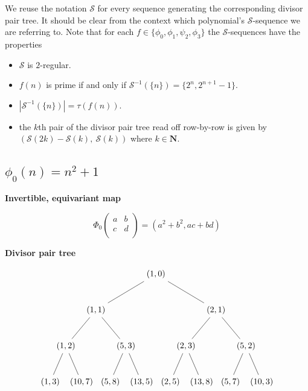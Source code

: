 \documentclass{article}
\begin{document}
 
 We reuse the notation $\mathcal{S}$ for every sequence generating the corresponding divisor pair tree. It should be clear from the context which polynomial's $\mathcal{S}$-sequence we are referring to. Note that for each $f \in \{\phi_0, \phi_1, \psi_2, \phi_3 \}$ the $\mathcal{S}$-sequences have the properties

\begin{itemize}
    \item $\mathcal{S}$ is $2$-regular.
    \item $f(n)$ is prime if and only if $\mathcal{S}^{-1}(\{n\}) = \{2^n, 2^{n+1} - 1 \}$.
     \item $|\mathcal{S}^{-1}(\{n \})| = \tau\left(f(n)\right)$.
     \item the $k$th pair of the divisor pair tree read off row-by-row is given by $\left( \mathcal{S}(2k) - \mathcal{S}(k), \ \mathcal{S}(k) \right)$ where $k \in \mathbf{N}$.
 \end{itemize}
 
\subsection{$\phi_0(n) = n^2 + 1$}

\textbf{Invertible, equivariant map}

$$\Phi_0 \begin{pmatrix}
    a & b \\
    c & d \\
\end{pmatrix} = (a^2 + b^2, ac + bd)$$

\textbf{Divisor pair tree}

$$
\begin{tikzpicture}[level distance=15mm, 
                    level 1/.style={sibling distance=50mm},
                    level 2/.style={sibling distance=25mm},
                    level 3/.style={sibling distance=13mm}]
  \node {\((1, 0)\)}
    child {
      node {\((1, 1)\)} 
      child {
        node {\((1, 2)\)}
        child {node {\((1, 3)\)}}
        child {node {\((10, 7)\)}}
      }
      child {
        node {\((5, 3)\)}
        child {node {\((5, 8)\)}}
        child {node {\((13, 5)\)}}
      }
    }
    child {
      node {\((2, 1)\)}
      child {
        node {\((2, 3)\)}
        child {node {\((2, 5)\)}}
        child {node {\((13, 8)\)}}
      }
      child {
        node {\((5, 2)\)}
        child {node {\((5, 7)\)}}
        child {node {\((10, 3)\)}}
      } 
    };
\end{tikzpicture}
$$
\end{document}
